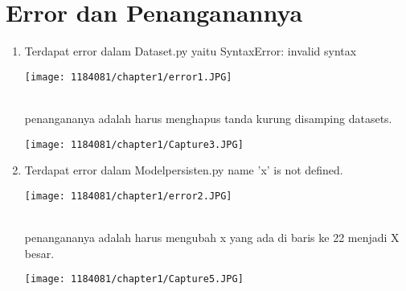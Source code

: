 \documentclass{article}
\begin{document}
\section{Error dan Penanganannya}
\begin{enumerate}
    \item Terdapat error dalam Dataset.py yaitu SyntaxError: invalid syntax
      \begin{center}
    \texttt{[image: 1184081/chapter1/error1.JPG]}
    \end{center}
    \\
    penangananya adalah harus menghapus tanda kurung disamping datasets.
     \begin{center}
    \texttt{[image: 1184081/chapter1/Capture3.JPG]}
    \end{center}
    \item Terdapat error dalam Modelpersisten.py name 'x' is not defined.
      \begin{center}
    \texttt{[image: 1184081/chapter1/error2.JPG]}
    \end{center}
    \\penangananya adalah harus mengubah x yang ada di baris ke 22 menjadi X besar.
     \begin{center}
    \texttt{[image: 1184081/chapter1/Capture5.JPG]}
    \end{center}

\end{enumerate}
\end{document}
